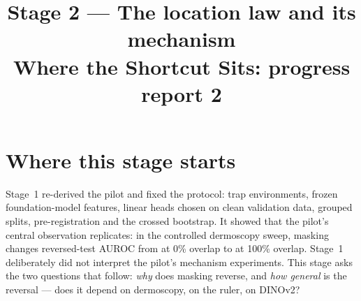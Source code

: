 

\newcommand{\notY}{1 = melanoma (dermoscopy), malignant nodule (thyroid), tumour with a solid component (ovary), erosion (capsule), pneumothorax (chest radiograph)}
\newcommand{\notA}{a synthetic artifact pasted at a controlled position: ruler (dermoscopy), sonographer caliper (thyroid, ovary), debris blob (capsule endoscopy), tube (chest radiograph)}
\newcommand{\notROI}{lesion, nodule, tumour, annotated lesion box, lungs}
\newcommand{\notCross}{the \emph{location interaction} $[\text{mask}-\text{ERM}]_{r=0}-[\text{mask}-\text{ERM}]_{r=1}$ of reversed-test AUROC on the same images.}
\newcommand{\notCI}{95\% crossed seed$\times$image bootstrap interval (Stage~1); every interval in this report uses it.}
\newcommand{\notExtra}{}
\title{\textbf{Stage 2 --- The location law and its mechanism}\\[3pt]\large Where the Shortcut Sits: progress report 2}
\author{}
\date{}

\maketitle
{}


\tableofcontents
\clearpage

\section{Where this stage starts}
Stage~1 re-derived the pilot and fixed the protocol: trap environments, frozen foundation-model features, linear heads
chosen on clean validation data, grouped splits, pre-registration and the crossed bootstrap. It showed that the
pilot's central observation replicates: in the controlled dermoscopy sweep, masking changes reversed-test AUROC from
\sTwoMaskZero{} at 0\% overlap to \sTwoMaskOneZeroZero{} at 100\% overlap. Stage~1 deliberately did not interpret the
pilot's mechanism experiments. This stage asks the two questions that follow: \emph{why} does masking reverse, and
\emph{how general} is the reversal --- does it depend on dermoscopy, on the ruler, on DINOv2?

